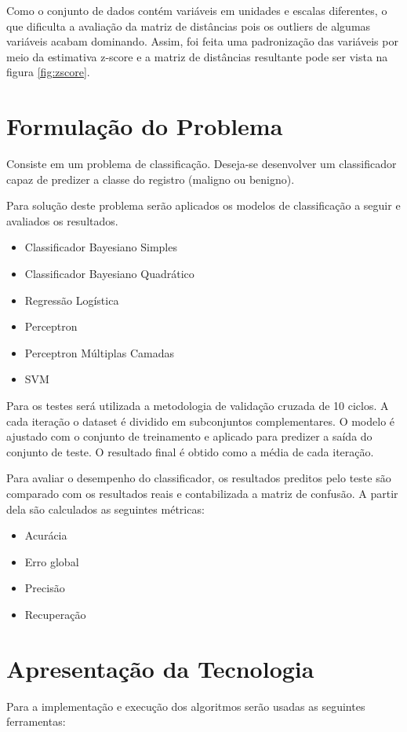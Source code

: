 \documentclass[11pt,a4paper]{article}
\numberwithin{equation}{section}
\begin{document}
Como o conjunto de dados contém variáveis em unidades e escalas diferentes, o que dificulta a avaliação da matriz de distâncias pois os outliers de algumas variáveis acabam dominando. Assim, foi feita uma padronização das variáveis por meio da estimativa z-score e a matriz de distâncias resultante pode ser vista na figura \ref{fig:zscore}.

\section{Formulação do Problema}
Consiste em um problema de classificação. Deseja-se desenvolver um classificador capaz de predizer a classe do registro (maligno ou benigno).

Para solução deste problema serão aplicados os modelos de classificação a seguir e avaliados os resultados.

\begin{itemize}
\item Classificador Bayesiano Simples
\item Classificador Bayesiano Quadrático
\item Regressão Logística
\item Perceptron
\item Perceptron Múltiplas Camadas
\item SVM
\end{itemize}

Para os testes será utilizada a metodologia de validação cruzada de 10 ciclos. A cada iteração o dataset é dividido em subconjuntos complementares. O modelo é ajustado com o conjunto de treinamento e aplicado para predizer a saída do conjunto de teste. O resultado final é obtido como a média de cada iteração. 

Para avaliar o desempenho do classificador, os resultados preditos pelo teste são comparado com os resultados reais e contabilizada a matriz de confusão. A partir dela são calculados as seguintes métricas:
\begin{itemize}
\item Acurácia
\item Erro global
\item Precisão 
\item Recuperação
\end{itemize}

\section{Apresentação da Tecnologia}
Para a implementação e execução dos algoritmos serão usadas as seguintes ferramentas:
\end{document}
